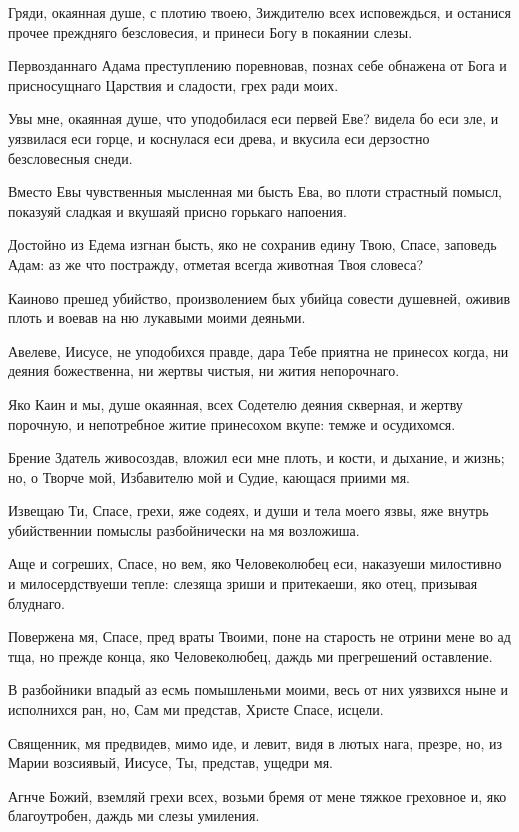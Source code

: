 Гряди, окаянная душе, с плотию твоею, Зиждителю всех исповеждься, и останися прочее преждняго безсловесия, и принеси Богу в покаянии слезы.


Первозданнаго Адама преступлению поревновав, познах себе обнажена от Бога и присносущнаго Царствия и сладости, грех ради моих.


Увы мне, окаянная душе, что уподобилася еси первей Еве? видела бо еси зле, и уязвилася еси горце, и коснулася еси древа, и вкусила еси дерзостно безсловесныя снеди.


Вместо Евы чувственныя мысленная ми бысть Ева, во плоти страстный помысл, показуяй сладкая и вкушаяй присно горькаго напоения.


Достойно из Едема изгнан бысть, яко не сохранив едину Твою, Спасе, заповедь Адам: аз же что постражду, отметая всегда животная Твоя словеса?


Каиново прешед убийство, произволением бых убийца совести душевней, оживив плоть и воевав на ню лукавыми моими деяньми.


Авелеве, Иисусе, не уподобихся правде, дара Тебе приятна не принесох когда, ни деяния божественна, ни жертвы чистыя, ни жития непорочнаго.


Яко Каин и мы, душе окаянная, всех Содетелю деяния скверная, и жертву порочную, и непотребное житие принесохом вкупе: темже и осудихомся.


Брение Здатель живосоздав, вложил еси мне плоть, и кости, и дыхание, и жизнь; но, о Творче мой, Избавителю мой и Судие, кающася приими мя.


Извещаю Ти, Спасе, грехи, яже содеях, и души и тела моего язвы, яже внутрь убийственнии помыслы разбойнически на мя возложиша.


Аще и согреших, Спасе, но вем, яко Человеколюбец еси, наказуеши милостивно и милосердствуеши тепле: слезяща зриши и притекаеши, яко отец, призывая блуднаго.


Повержена мя, Спасе, пред враты Твоими, поне на старость не отрини мене во ад тща, но прежде конца, яко Человеколюбец, даждь ми прегрешений оставление.


В разбойники впадый аз есмь помышленьми моими, весь от них уязвихся ныне и исполнихся ран, но, Сам ми представ, Христе Спасе, исцели.


Священник, мя предвидев, мимо иде, и левит, видя в лютых нага, презре, но, из Марии возсиявый, Иисусе, Ты, представ, ущедри мя.


Агнче Божий, вземляй грехи всех, возьми бремя от мене тяжкое греховное и, яко благоутробен, даждь ми слезы умиления.


